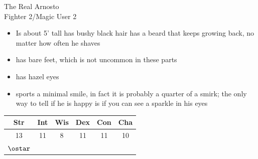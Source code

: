 \documentclass[11pt]{article}
\begin{document}
\hspace{0.4cm}
\begin{minipage}{0.55\textwidth}%
    \Huge{\Fontauri The Real Arnosto} \\
    \Large{Fighter 2/Magic User 2} \\
    \begin{normalsize}
        \begin{itemize}[topsep=0pt, itemsep=0pt, partopsep=0pt, parsep=0pt, leftmargin=*]
            \item Is about 5’ tall has bushy black hair has a beard that keeps growing back, no matter how often he shaves
            \item has bare feet, which is not uncommon in these parts
            \item has hazel eyes
            \item sports a minimal smile, in fact it is probably a quarter of a smirk; the only way to tell if he is happy is if you can see a sparkle in his eyes
        \end{itemize}
    \end{normalsize}
    \begin{large}
        \vspace{0.4cm}
        \begin{tabular}{cccccc}
            Str & Int & Wis & Dex & Con & Cha \\ \hline
            13 & 11 & 8 & 11 & 11 & 10\\ 
            $\ostar$ & & & & & 
        \end{tabular}
    \end{large}
    \vspace{0.4cm}


\end{minipage}
\end{document}
